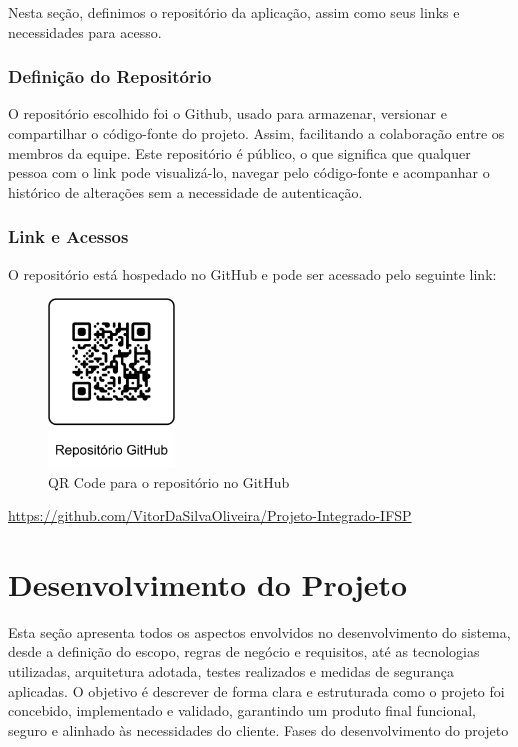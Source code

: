 \documentclass[
	12pt,				%
	openany,			%
	twoside,			%
	a4paper,			%
	english,			%
	brazil				%
	]{abntex2}
\begin{document}
Nesta seção, definimos o repositório da aplicação, assim como seus links e necessidades para acesso.

\subsection{Definição do Repositório}

O repositório escolhido foi o Github, usado para armazenar, versionar e compartilhar o código-fonte do projeto. Assim, facilitando a colaboração entre os membros da equipe. Este repositório é público, o que significa que qualquer pessoa com o link pode visualizá-lo, navegar pelo código-fonte e acompanhar o histórico de alterações sem a necessidade de autenticação.

\subsection{Link e Acessos}

O repositório está hospedado no GitHub e pode ser acessado pelo seguinte link:

\begin{figure}[h!]
    \centering
    \includegraphics[width=0.3\textwidth]{Figuras/QR-CODE-GitHub.png}
    \caption{QR Code para o repositório no GitHub}
\end{figure}

\begin{center}
    \href{https://github.com/VitorDaSilvaOliveira/Projeto-Integrado-IFSP}{https://github.com/VitorDaSilvaOliveira/Projeto-Integrado-IFSP}
\end{center}

\chapter{Desenvolvimento do Projeto}

Esta seção apresenta todos os aspectos envolvidos no desenvolvimento do sistema, desde a definição do escopo, regras de negócio e requisitos, até as tecnologias utilizadas, arquitetura adotada, testes realizados e medidas de segurança aplicadas. O objetivo é descrever de forma clara e estruturada como o projeto foi concebido, implementado e validado, garantindo um produto final funcional, seguro e alinhado às necessidades do cliente.
Fases do desenvolvimento do projeto
\end{document}
